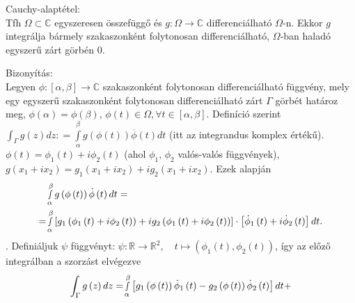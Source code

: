 \documentclass[12pt,a4paper]{scrartcl}
\newenvironment{tetel}{}{}
\newenvironment{bizonyitas}{}{}
\begin{document}
\begin{tetel}

Cauchy-alaptétel:\\
Tfh \(\Omega \subset {\mathbb{C}}\) egyszeresen összefüggő és
\(\left. g:\Omega\rightarrow{\mathbb{C}} \right.\) differenciálható
\(\Omega\)-n. Ekkor \(g\) integrálja bármely szakaszonként folytonosan
differenciálható, \(\Omega\)-ban haladó egyszerű zárt görbén 0.

\end{tetel}

\begin{bizonyitas}

Bizonyítás:\\
Legyen
\(\left. \phi:\left\lbrack {\alpha,\beta} \right\rbrack\rightarrow{\mathbb{C}} \right.\)
szakaszonként folytonosan differenciálható függvény, mely egy egyszerű
szakaszonként folytonosan differenciálható zárt \(\Gamma\) görbét
határoz meg, \(\phi\left( \alpha \right) = \phi\left( \beta \right)\),
\(\phi\left( t \right) \in \Omega,\forall t \in \left\lbrack {\alpha,\beta} \right\rbrack\).
Definíció szerint
\({\int_{\Gamma}{g\left( z \right)dz}}: = {\int\limits_{\alpha}^{\beta}{g\left( {\phi\left( t \right)} \right)\overset{.}{\phi}\left( t \right)dt}}\)
(itt az integrandus komplex értékű).
\(\phi\left( t \right) = \phi_{1}\left( t \right) + i\phi_{2}\left( t \right)\)
(ahol \(\phi_{1},\,\phi_{2}\) valós-valós függvények),
\(g\left( {x_{1} + ix_{2}} \right) = g_{1}\left( {x_{1} + ix_{2}} \right) + ig_{2}\left( {x_{1} + ix_{2}} \right)\).
Ezek alapján \[\begin{aligned}
   & \mathop \smallint \limits_\alpha ^\beta  g\left( {\phi \left( t \right)} \right)\dot \phi \left( t \right)dt =  \\ 
   =  & \mathop \smallint \limits_\alpha ^\beta  \left[ {{g_1}\left( {{\phi _1}\left( t \right) + i{\phi _2}\left( t \right)} \right) + i{g_2}\left( {{\phi _1}\left( t \right) + i{\phi _2}\left( t \right)} \right)} \right] \cdot \left[ {{{\dot \phi }_1}\left( t \right) + i{{\dot \phi }_2}\left( t \right)} \right]dt .\\ 
\end{aligned} \] . Definiáljuk \(\psi\) függvényt:
\(\left. \psi:{\mathbb{R}}\rightarrow{\mathbb{R}}^{2},\quad t\mapsto\left( {\phi_{1}\left( t \right),\phi_{2}\left( t \right)} \right) \right.\),
így az előző integrálban a szorzást elvégezve \[\begin{aligned}
  \int_\Gamma  {g\left( z \right)dz}  =  & \mathop \smallint \limits_\alpha ^\beta  \left[ {{g_1}\left( {\phi \left( t \right)} \right){{\dot \phi }_1}\left( t \right) - {g_2}\left( {\phi \left( t \right)} \right){{\dot \phi }_2}\left( t \right)} \right]dt +  \\ 

\end{aligned}\]
\end{bizonyitas}
\end{document}
